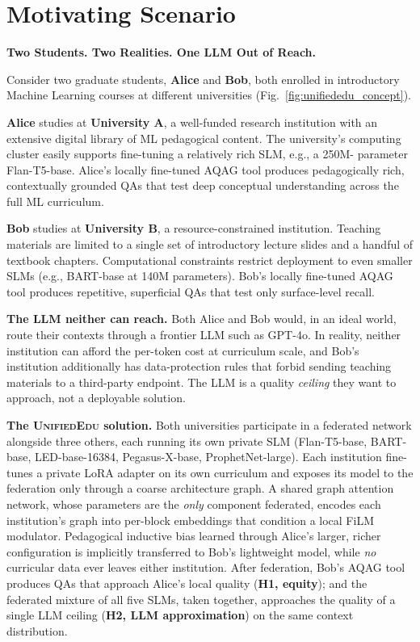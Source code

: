 \documentclass[11pt]{article}
\theoremstyle{plain}
\theoremstyle{definition}
\theoremstyle{remark}
\newcommand{\UniEdu}{\textsc{UnifiedEdu}}
\begin{document}
\section{Motivating Scenario}
\label{sec:scenario}

\begin{scenariobox}
\textbf{Two Students. Two Realities. One LLM
Out of Reach.}

\medskip
Consider two graduate students, \textbf{Alice} and
\textbf{Bob}, both enrolled in introductory Machine
Learning courses at different universities
(Fig.~\ref{fig:unifiededu_concept}).

\medskip
\textbf{Alice} studies at \textbf{University A}, a
well-funded research institution with an extensive
digital library of ML pedagogical content. The
university's computing cluster easily supports
fine-tuning a relatively rich SLM, e.g., a 250M-
parameter Flan-T5-base. Alice's locally fine-tuned
AQAG tool produces pedagogically rich, contextually
grounded QAs that test deep conceptual understanding
across the full ML curriculum.

\medskip
\textbf{Bob} studies at \textbf{University B}, a
resource-constrained institution. Teaching materials
are limited to a single set of introductory lecture
slides and a handful of textbook chapters.
Computational constraints restrict deployment to
even smaller SLMs (e.g., BART-base at 140M
parameters). Bob's locally fine-tuned AQAG tool
produces repetitive, superficial QAs that test only
surface-level recall.

\medskip
\textbf{The LLM neither can reach.} Both Alice and
Bob would, in an ideal world, route their contexts
through a frontier LLM such as GPT-4o. In reality,
neither institution can afford the per-token cost at
curriculum scale, and Bob's institution additionally
has data-protection rules that forbid sending
teaching materials to a third-party endpoint. The
LLM is a quality \emph{ceiling} they want to
approach, not a deployable solution.

\medskip
\textbf{The \UniEdu{} solution.} Both universities
participate in a federated network alongside three
others, each running its own private SLM
(Flan-T5-base, BART-base, LED-base-16384,
Pegasus-X-base, ProphetNet-large). Each institution
fine-tunes a private LoRA adapter on its own
curriculum and exposes its model to the federation
only through a coarse architecture graph. A shared
graph attention network, whose parameters are the
\emph{only} component federated, encodes each
institution's graph into per-block embeddings that
condition a local FiLM modulator. Pedagogical
inductive bias learned through Alice's larger,
richer configuration is implicitly transferred to
Bob's lightweight model, while \emph{no} curricular
data ever leaves either institution. After
federation, Bob's AQAG tool produces QAs that
approach Alice's local quality (\textbf{H1, equity});
and the federated mixture of all five SLMs, taken
together, approaches the quality of a single LLM
ceiling (\textbf{H2, LLM approximation}) on the same
context distribution.
\end{scenariobox}
\end{document}
